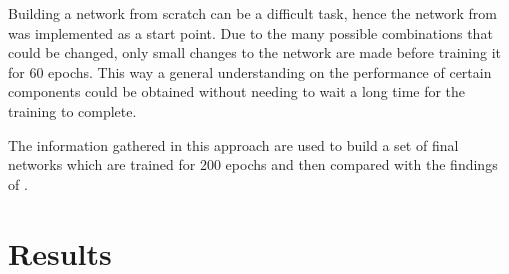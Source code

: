 \documentclass[
a4paper, 
12pt,
grayscalebody, %
abstract=on,
twoside, BCOR10mm, 12pt, DIV13,headinclude, footexclude, final, abstracton, openright
]{ibireprt}
\numberwithin{equation}{chapter}
\numberwithin{table}{chapter}
\numberwithin{figure}{chapter}
\numberwithin{algorithm}{chapter}
\numberwithin{example}{chapter}
\numberwithin{example}{chapter}
\begin{document}
Building a network from scratch can be a difficult task, hence the network from \citet{Walle2023} was implemented as a start point. Due to the many possible combinations that could be changed, only small changes to the network are made before training it for 60 epochs. This way a general understanding on the performance of certain components could be obtained without needing to wait a long time for the training to complete. 

The information gathered in this approach are used to build a set of final networks which are trained for 200 epochs and then compared with the findings of \citet{Walle2023}.












\chapter{Results}

\end{document}
